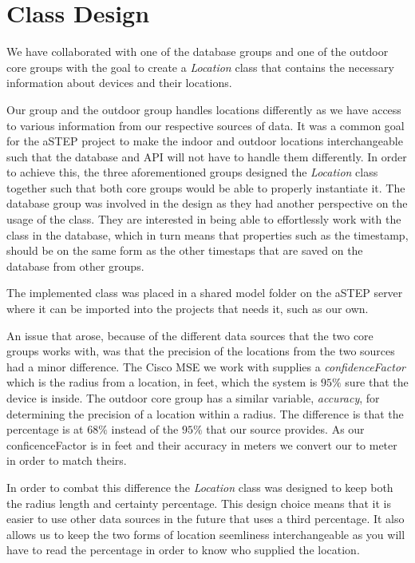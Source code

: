 \section{Class Design}\label{sec:class_design}
We have collaborated with one of the database groups and one of the outdoor core groups with the goal to create a \textit{Location} class that contains the necessary information about devices and their locations. 

Our group and the outdoor group handles locations differently as we have access to various information from our respective sources of data. It was a common goal for the aSTEP project to make the indoor and outdoor locations interchangeable such that the database and API will not have to handle them differently. In order to achieve this, the three aforementioned groups designed the \textit{Location} class together such that both core groups would be able to properly instantiate it. The database group was involved in the design as they had another perspective on the usage of the class. They are interested in being able to effortlessly work with the class in the database, which in turn means that properties such as the timestamp, should be on the same form as the other timestaps that are saved on the database from other groups. 

The implemented class was placed in a shared model folder on the aSTEP server %
where it can be imported into the projects that needs it, such as our own. 

An issue that arose, because of the different data sources that the two core groups works with, was that the precision of the locations from the two sources had a minor difference. The Cisco MSE we work with supplies a \textit{confidenceFactor} which is the radius from a location, in feet, which the system is $95\%$ sure that the device is inside\cite{MSE_faq}. The outdoor core group has a similar variable, \textit{accuracy}, for determining the precision of a location within a radius. The difference is that the percentage is at $68\%$ instead of the $95\%$ that our source provides\cite{android_getAccuracy}. As our conficenceFactor is in feet and their accuracy in meters we convert our to meter in order to match theirs. 

In order to combat this difference the \textit{Location} class was designed to keep both the radius length and certainty percentage. This design choice means that it is easier to use other data sources in the future that uses a third percentage. It also allows us to keep the two forms of location seemliness interchangeable as you will have to read the percentage in order to know who supplied the location.